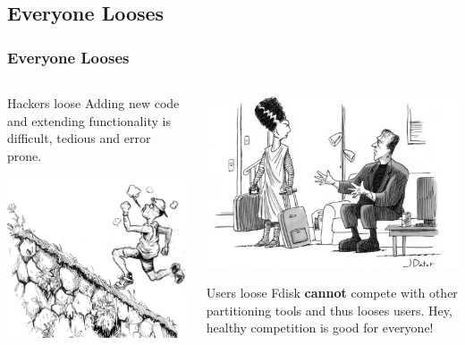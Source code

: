 \documentclass{beamer}
\begin{document}
\subsection{Everyone Looses}
\begin{frame}\frametitle{Everyone Looses}
    \begin{columns}
      \begin{column}{.5\linewidth}
        \begin{block}{Hackers loose}
          Adding new code and extending functionality is difficult, tedious and error prone.
        \end{block}\pause
        \includegraphics[scale=0.3]{img/running-uphill}
      \end{column}
      \begin{column}{.5\linewidth} 
        \includegraphics[scale=0.5]{img/leaving}
        \begin{block}{Users loose}
        Fdisk \textbf{cannot} compete with other partitioning tools and thus looses users. Hey, healthy competition is good for everyone!
        \end{block}
      \end{column}
    \end{columns}
  \end{frame}
\end{document}
